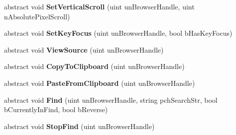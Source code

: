 \begin{DoxyCompactItemize}
\item 
\mbox{\label{class_valve_1_1_steamworks_1_1_i_steam_h_t_m_l_surface_a173afbb7cf0b6b086744f44f4d8638a4}} 
abstract void {\bfseries Set\+Vertical\+Scroll} (uint un\+Browser\+Handle, uint n\+Absolute\+Pixel\+Scroll)
\item 
\mbox{\label{class_valve_1_1_steamworks_1_1_i_steam_h_t_m_l_surface_a7a3ed8d58c67c56c2251937b47b535ab}} 
abstract void {\bfseries Set\+Key\+Focus} (uint un\+Browser\+Handle, bool b\+Has\+Key\+Focus)
\item 
\mbox{\label{class_valve_1_1_steamworks_1_1_i_steam_h_t_m_l_surface_aa1e3bb90a3af74f45a9455fd9c7c9c91}} 
abstract void {\bfseries View\+Source} (uint un\+Browser\+Handle)
\item 
\mbox{\label{class_valve_1_1_steamworks_1_1_i_steam_h_t_m_l_surface_a19be658610a70ba10acc94e1716afb24}} 
abstract void {\bfseries Copy\+To\+Clipboard} (uint un\+Browser\+Handle)
\item 
\mbox{\label{class_valve_1_1_steamworks_1_1_i_steam_h_t_m_l_surface_a70e27917f587657d681deef6714a191f}} 
abstract void {\bfseries Paste\+From\+Clipboard} (uint un\+Browser\+Handle)
\item 
\mbox{\label{class_valve_1_1_steamworks_1_1_i_steam_h_t_m_l_surface_a46abbf2545c62109c7282edff79ec682}} 
abstract void {\bfseries Find} (uint un\+Browser\+Handle, string pch\+Search\+Str, bool b\+Currently\+In\+Find, bool b\+Reverse)
\item 
\mbox{\label{class_valve_1_1_steamworks_1_1_i_steam_h_t_m_l_surface_a136168b66616bc5b13cb57e86a8fb4c1}} 
abstract void {\bfseries Stop\+Find} (uint un\+Browser\+Handle)
\item 
\mbox{\label{class_valve_1_1_steamworks_1_1_i_steam_h_t_m_l_surface_a09ada881801d726d5c64c524540956f2}} 

\end{DoxyCompactItemize}
